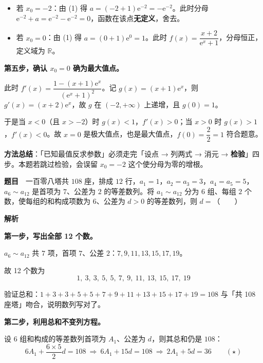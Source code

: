 \begin{itemize}
\item 若 $x_0=-2$：由 (1) 得 $a=(-2+1)\mathrm{e}^{-2}=-\mathrm{e}^{-2}$。此时分母 $\mathrm{e}^{-2}+a=\mathrm{e}^{-2}-\mathrm{e}^{-2}=0$，函数在该点\textbf{无定义}，舍去。
\item 若 $x_0=0$：由 (1) 得 $a=(0+1)\mathrm{e}^{0}=1$。此时 $f(x)=\dfrac{x+2}{\mathrm{e}^x+1}$，分母恒正，定义域为 $\mathbb{R}$。
\end{itemize}

\textbf{第五步，确认 $x_0=0$ 确为最大值点。}

此时 $f'(x)=\dfrac{1-(x+1)\mathrm{e}^{x}}{(\mathrm{e}^{x}+1)^2}$。记 $g(x)=(x+1)\mathrm{e}^x$，则 $g'(x)=(x+2)\mathrm{e}^x$，故 $g$ 在 $(-2,+\infty)$ 上递增，且 $g(0)=1$。

于是当 $x<0$（且 $x>-2$）时 $g(x)<1$，$f'(x)>0$；当 $x>0$ 时 $g(x)>1$，$f'(x)<0$。故 $x=0$ 是极大值点，也是最大值点，$f(0)=\dfrac{2}{2}=1$  符合题意。


\begin{gktip}
\textbf{方法总结}：「已知最值反求参数」必须走完「设点 → 列两式 → 消元 → \textbf{检验}」四步。本题若跳过检验，会误留 $x_0=-2$ 这个使分母为零的增根。
\end{gktip}

\par\medskip


\textbf{题目}　一百零八塔共 $108$ 座，排成 $12$ 行，$a_1=1$，$a_2=a_3=3$，$a_4=a_5=5$，$a_6\sim a_{12}$ 是首项为 $7$、公差为 $2$ 的等差数列。将 $a_1\sim a_{12}$ 分为 $6$ 组、每组 $2$ 个数，使每组的和构成项数为 $6$、公差为 $d>0$ 的等差数列，则 $d=$（　　）

\textbf{解析}

\textbf{第一步，写出全部 12 个数。}

$a_6\sim a_{12}$ 共 $7$ 项，首项 $7$、公差 $2$：$7,9,11,13,15,17,19$。

故 12 个数为
\[1,\ 3,\ 3,\ 5,\ 5,\ 7,\ 9,\ 11,\ 13,\ 15,\ 17,\ 19\]

验证总和：$1+3+3+5+5+7+9+11+13+15+17+19=108$  与「共 108 座塔」吻合，说明数列写对了。

\textbf{第二步，利用总和不变列方程。}

设 $6$ 组和构成的等差数列首项为 $A_1$、公差为 $d$，则其总和仍是 $108$：
\[6A_1+\frac{6\times5}{2}d=108\ \Longrightarrow\ 6A_1+15d=108\ \Longrightarrow\ 2A_1+5d=36\qquad(\star)\]

